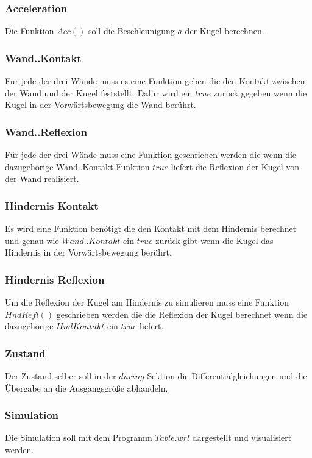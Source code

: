 \documentclass[]{scrartcl}
\begin{document}
\subsubsection{Acceleration}
Die Funktion $Acc()$ soll die Beschleunigung $a$ der Kugel berechnen.

\subsubsection{Wand..Kontakt}
Für jede der drei Wände muss es eine Funktion geben die den Kontakt zwischen der Wand und der Kugel feststellt. Dafür wird ein $true$ zurück gegeben wenn die Kugel in der Vorwärtsbewegung die Wand berührt.

\subsubsection{Wand..Reflexion}
Für jede der drei Wände muss eine Funktion geschrieben werden die wenn die dazugehörige Wand..Kontakt Funktion $true$ liefert die Reflexion der Kugel von der Wand realisiert.

\subsubsection{Hindernis Kontakt}
Es wird eine Funktion benötigt die den Kontakt mit dem Hindernis berechnet und genau wie $Wand..Kontakt$ ein $true$ zurück gibt wenn die Kugel das Hindernis in der Vorwärtsbewegung berührt.

\subsubsection{Hindernis Reflexion} 
Um die Reflexion der Kugel am Hindernis zu simulieren muss eine Funktion $HndRefl()$ geschrieben werden die die Reflexion der Kugel berechnet wenn die dazugehörige $HndKontakt$ ein $true$ liefert.

\subsubsection{Zustand}
Der Zustand selber soll in der $during$-Sektion die Differentialgleichungen und die Übergabe an die Ausgangsgröße abhandeln.

\subsubsection{Simulation}
Die Simulation soll mit dem Programm $Table.wrl$ dargestellt und visualisiert werden.
\end{document}
